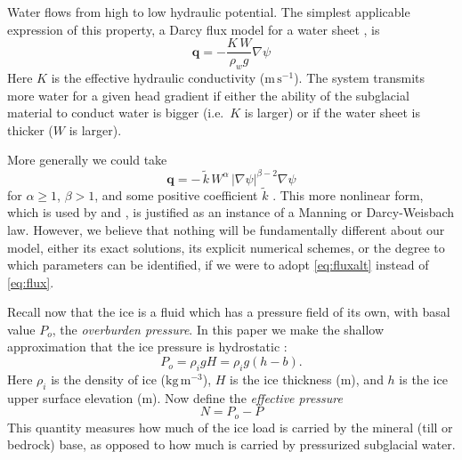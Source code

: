 \documentclass[11pt,final]{amsart}%
\newcommand\bq{\mathbf{q}}
\newcommand{\grad}{\nabla}
\begin{document}
Water flows from high to low hydraulic potential.  The simplest applicable expression of this property, a Darcy flux model for a water sheet \citep{Clarke05}, is
\begin{equation}  \label{eq:flux}
\bq = - \frac{K \, W}{\rho_w g} \grad \psi
\end{equation}
Here $K$ is the effective hydraulic conductivity ($\text{m}\,\text{s}^{-1}$).  The system transmits more water for a given head gradient if either the ability of the subglacial material to conduct water is bigger (i.e.~$K$ is larger) or if the water sheet is thicker ($W$ is larger).

More generally we could take
\begin{equation}  \label{eq:fluxalt}
\bq = - \,\tilde k\, W^\alpha\, |\grad \psi|^{\beta-2} \grad \psi
\end{equation}
for $\alpha\ge 1$, $\beta>1$, and some positive coefficient $\tilde k$ \citep{Schoofetal2012}.  This more nonlinear form, which is used by \cite{Hewittetal2012} and \cite{Schoofetal2012}, is justified as an instance of a Manning or Darcy-Weisbach law.  However, we believe that nothing will be fundamentally different about our model, either its exact solutions, its explicit numerical schemes, or the degree to which parameters can be identified, if we were to adopt \eqref{eq:fluxalt} instead of \eqref{eq:flux}.

Recall now that the ice is a fluid which has a pressure field of its own, with basal value $P_o$, the \emph{overburden pressure}.  In this paper we make the shallow approximation that the ice pressure is hydrostatic \citep{GreveBlatter2009}:
\begin{equation} \label{eq:hydrostatic}
  P_o = \rho_i g H = \rho_i g (h-b).
\end{equation}
Here $\rho_i$ is the density of ice ($\text{kg}\,\text{m}^{-3}$), $H$ is the ice thickness (m), and $h$ is the ice upper surface elevation (m).  Now define the \emph{effective pressure}
\begin{equation}
N = P_o - P\label{eq:effective}
\end{equation}
This quantity measures how much of the ice load is carried by the mineral (till or bedrock) base, as opposed to how much is carried by pressurized subglacial water.

\end{document}

